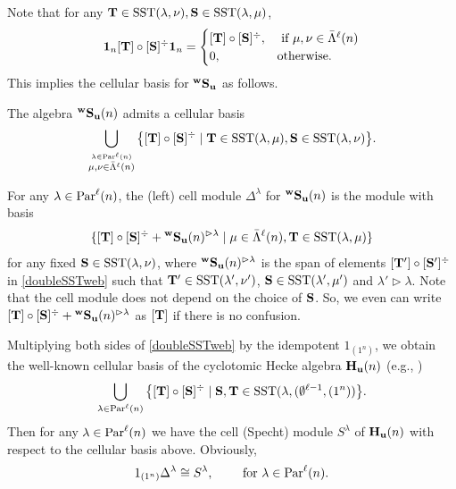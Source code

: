 Note that for any $\mathbf{T}\in \text{SST}(\lambda,\nu), \mathbf{S}\in \text{SST}(\lambda,\mu)$, 
\begin{equation}
  {\bf1}_n [\mathbf{T}]\circ [\mathbf{S}]^\div {\bf1}_n= \begin{cases}
    [\mathbf{T}]\circ [\mathbf{S}]^\div, & \text{ if }\mu,\nu \in \bar\Lambda^\ell(n)\\
    0,& \text{otherwise}.
\end{cases} 
\end{equation}
This implies the cellular basis for ${}^{\bold{w}}\bold{S}_{\mathbf{u}}$ as follows. 
\begin{theorem}
  \label{thm:cellularforwebu}
The algebra ${}^{\bold{w}}\bold{S}_{\mathbf{u}}(n)$ admits a cellular basis  
\begin{align}  \label{doubleSSTweb}
\bigcup_{\overset{\lambda\in \text{Par}^\ell(n)}{\mu,\nu\in \bar\Lambda^\ell(n)} }
\big\{ [\mathbf{T}]\circ [\mathbf{S}]^\div \mid \mathbf{T}\in \text{SST}(\lambda,\mu), \mathbf{S}\in \text{SST}(\lambda,\nu) \big\}. 
\end{align}
\end{theorem}
 For any $\lambda\in \text{Par}^\ell(n)$, the (left) cell module   $\Delta^\lambda$ for ${}^{\bold{w}}\bold{S}_{\mathbf{u}}(n)$ is the module with basis 
 \[ 
 \{[\mathbf{T}]\circ [\mathbf{S}]^\div + {}^{\bold{w}}\bold{S}_{\mathbf{u}}(n)^{\rhd\lambda} \mid \mu\in \bar\Lambda^\ell(n), \mathbf{T} \in \text{SST}(\lambda,\mu)\} 
 \]
for any fixed $\mathbf{S}\in \text{SST}(\lambda, \nu)$, where ${}^{\bold{w}}\bold{S}_{\mathbf{u}}(n)^{\rhd\lambda}$ is the span of elements $[\mathbf{T}']\circ [\mathbf{S}']^\div $ in \eqref{doubleSSTweb}
such that $\mathbf{T}'\in \text{SST}(\lambda',\nu') $, $\mathbf{S}\in \text{SST}(\lambda',\mu')$ and $\lambda'\rhd \lambda$.
Note that the cell module does not depend on the choice of $\bf S$. So, we even can write
$[\mathbf{T}]\circ [\mathbf{S}]^\div + {}^{\bold{w}}\bold{S}_{\mathbf{u}}(n)^{\rhd\lambda}$ as $[\mathbf{T}]$ if there is no confusion.
\begin{rem}
\label{rem:cellularforcychecke}
Multiplying both sides of \eqref{doubleSSTweb} by the idempotent $1_{(1^n)}$, we obtain the well-known  cellular basis of the cyclotomic Hecke algebra $\mathbf{H}_{\mathbf{u}}(n)$ (e.g., \cite{DJM98}) 
\begin{align}  \label{doubleSSTheck}
\bigcup_{ \lambda\in \text{Par}^\ell(n) }
\big\{ [\mathbf{T}]\circ [\mathbf{S}]^\div \mid \mathbf{S}, \mathbf{T}\in \text{SST}(\lambda,(\emptyset^{\ell-1},(1^n))  \big\}. 
\end{align}
Then for any $\lambda\in  \text{Par}^\ell(n)$ we have the cell (Specht) module $ S^\lambda$ of $\mathbf{H}_{\mathbf{u}}(n)$ with respect to the cellular basis above. Obviously, 
\begin{equation}
\label{equ:idemoncell}
 1_{(1^n)} \Delta^\lambda \cong  S^\lambda, \qquad
 \text{ for } \lambda \in  \text{Par}^\ell(n).   
\end{equation}
\end{rem}

